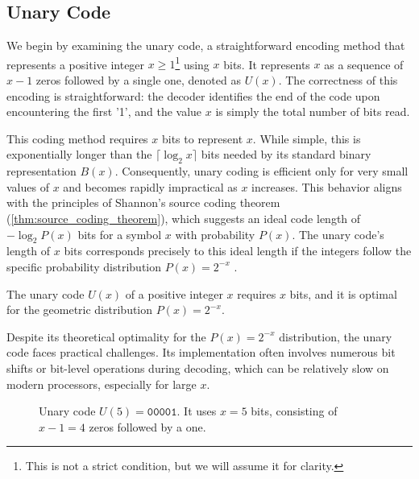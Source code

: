 \subsection{Unary Code}
We begin by examining the unary code, a straightforward encoding method that represents a positive integer $x \geq 1$\footnote{This is not a strict condition, but we will assume it for clarity.} using $x$ bits. It represents $x$ as a sequence of $x-1$ zeros followed by a single one, denoted as $U(x)$. The correctness of this encoding is straightforward: the decoder identifies the end of the code upon encountering the first '1', and the value $x$ is simply the total number of bits read.

\noindent This coding method requires $x$ bits to represent $x$. While simple, this is exponentially longer than the $\lceil\log_2 x \rceil$ bits needed by its standard binary representation $B(x)$. Consequently, unary coding is efficient only for very small values of $x$ and becomes rapidly impractical as $x$ increases. This behavior aligns with the principles of Shannon's source coding theorem (\autoref{thm:source_coding_theorem}), which suggests an ideal code length of $-\log_2 P(x)$ bits for a symbol $x$ with probability $P(x)$. The unary code's length of $x$ bits corresponds precisely to this ideal length if the integers follow the specific probability distribution $P(x) = 2^{-x}$ \cite{ferragina2023pearls}.

\begin{theorem}
    The unary code $U(x)$ of a positive integer $x$ requires $x$ bits, and it is optimal for the geometric distribution $P(x)=2^{-x}$.
\end{theorem}

\noindent Despite its theoretical optimality for the $P(x)=2^{-x}$ distribution, the unary code faces practical challenges. Its implementation often involves numerous bit shifts or bit-level operations during decoding, which can be relatively slow on modern processors, especially for large $x$.

\begin{figure}[hbtp]
    \centering
    \caption{Unary code $U(5) = \texttt{00001}$. It uses $x=5$ bits, consisting of $x-1=4$ zeros followed by a one.}
    \label{fig:unary_code_example}
\end{figure}


